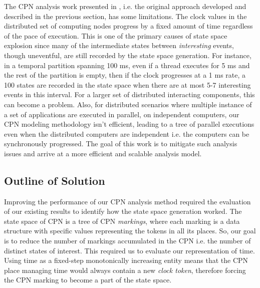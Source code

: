 
The CPN analysis work presented in \cite{kumar2014colored}, i.e. the original approach developed and described in the previous section, has some limitations. The clock values in the distributed set of computing nodes progress by a fixed amount of time regardless of the pace of execution. This is one of the primary causes of state space explosion since many of the intermediate states between \emph{interesting} events, though uneventful, are still recorded by the state space generation. For instance, in a temporal partition spanning 100 ms, even if a thread executes for 5 ms and the rest of the partition is empty, then if the clock progresses at a 1 ms rate, a 100 states are recorded in the state space when there are at most 5-7 interesting events in this interval. For a larger set of distributed interacting components, this can become a problem. Also, for distributed scenarios where multiple instance of a set of applications are executed in parallel, on independent computers, our CPN modeling methodology isn't efficient, leading to a tree of parallel executions even when the distributed computers are independent i.e. the computers can be synchronously progressed. The goal of this work is to mitigate such analysis issues and arrive at a more efficient and scalable analysis model. 

\subsection{Outline of Solution}
Improving the performance of our CPN analysis method required the evaluation of our existing results to identify how the state space generation worked. The state space of CPN is a tree of CPN \emph{markings}, where each marking is a data structure with specific values representing the tokens in all its places. So, our goal is to reduce the number of markings accumulated in the CPN i.e. the number of distinct states of interest. This required us to evaluate our representation of time. Using time as a fixed-step monotonically increasing entity means that the CPN place managing time would always contain a new \emph{clock token}, therefore forcing the CPN marking to become a part of the state space.

